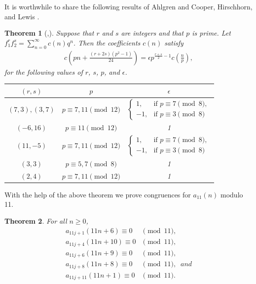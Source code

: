\documentclass[a4paper,12pt,reqno]{amsart}
\newtheorem{theorem}{Theorem}[section]
\numberwithin{equation}{section}
\begin{document}
\noindent It is worthwhile to share the following results of Ahlgren \cite{r11} and Cooper, Hirschhorn, and Lewis \cite{rc1}.
\begin{theorem}[\cite{r11},\cite{rc1}]\label{imp}
	Suppose that $r$ and $s$ are integers and that $p$ is prime.  
	Let $f_1^r f_2^s =\sum_{n=0}^{\infty} c(n) q^n$. Then the coefficients $c(n)$ satisfy
	\begin{align*}
		c\left( pn + \frac{(r + 2s)(p^2 - 1)}{24}\right)=\epsilon
		p^{\frac{r+s}{2}-1} c\left(\frac{n}{p}\right),
	\end{align*}
	for the following values of $r$, $s$, $p$, and $\epsilon$.
	\begin{table}[h]
		\centering
		\begin{tabular}{|c|c|c|}
			\hline
			$(r,s)$ & $p$ & $\epsilon$  \\ 
			\hline
			$(7, 3), (3, 7)$ & $p\equiv7, 11\pmod{12} $& 
			$\begin{cases}
				1, & \text{if } p\equiv7\pmod{8}, \\
				-1, & \text{if } p\equiv3\pmod{8}
			\end{cases}$\\
			$(-6, 16)$ & $p\equiv 11\pmod{12}$ & 1\\ 
			$(11, -5)$ & $p\equiv7, 11\pmod{12} $& 
			$\begin{cases}
				1, & \text{if } p\equiv7\pmod{8}, \\
				-1, & \text{if } p\equiv3\pmod{8}
			\end{cases}$\\
			$(3,3)$ & $p\equiv 5,7\pmod{8}$ & 1\\ 
			$(2, 4)$ & $p\equiv7, 11\pmod{12} $&1\\
			\hline
		\end{tabular}
	\end{table}
	
\end{theorem}
\noindent With the help of the above theorem we prove congruences for $a_{11}(n)$  modulo 11.
\begin{theorem}\label{t:2.1.9}
	For all $n \geq 0$,  
	\begin{align}
		a_{11j+1}(11n+6)\equiv 0& \pmod{11}\label{1.5},\\
		a_{11j+4}(11n+10)\equiv 0& \pmod{11}\label{1.6},\\
		a_{11j+6}(11n+9)\equiv 0& \pmod{11}\label{1.7},\\
		a_{11j+8}(11n+8)\equiv 0& \pmod{11}\label{1.8},\;\; and\\
		a_{11j+11}(11n+1)\equiv 0& \pmod{11}\label{1.9}.
	\end{align}
\end{theorem}
\end{document}
